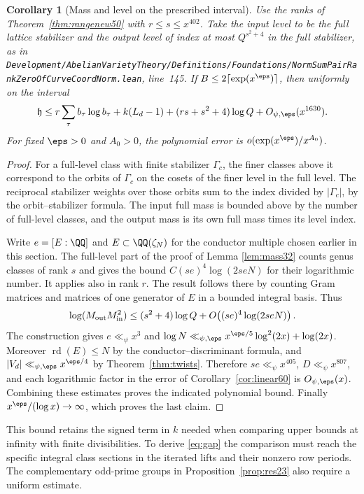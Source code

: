 \documentclass[a4paper,11pt]{article}
\newtheorem{corollary}[proposition]{Corollary}
\theoremstyle{definition}
\theoremstyle{remark}
\newcommand{\srcloc}[2]{{\small\nolinkurl{#1.lean}}, line~#2}
\numberwithin{equation}{section}
\begin{document}
\begin{corollary}[Mass and level on the prescribed interval]\label{cor:mass60}
Use the ranks of Theorem~\ref{thm:rangenew50} with
\(r\le s\le x^{402}\). Take the input level to be the full
lattice stabilizer and the output level of index at most
\(Q^{s^2+4}\) in the full stabilizer, as in
\srcloc{Development/AbelianVarietyTheory/Definitions/Foundations/NormSumPairRankZeroOfCurveCoordNorm}{145}.
If \(B\le2\lceil\exp(x^\eps)\rceil\), then uniformly on the interval
\[
 \mathfrak h\le r\sum_\tau b_\tau\log b_\tau+k(L_d-1)
        +(rs+s^2+4)\log Q+O_{\psi,\eps}(x^{1630}) .
\]
For fixed \(\eps>0\) and \(A_0>0\), the polynomial error is
\(o(\exp(x^\eps)/x^{A_0})\).
\end{corollary}
\begin{proof}
For a full-level class with finite stabilizer \(\Gamma_c\),
the finer classes above it correspond to the orbits of
\(\Gamma_c\) on the cosets of the finer level in the full level.
The reciprocal stabilizer weights over those orbits sum to the
index divided by \(|\Gamma_c|\), by the orbit--stabilizer
formula. The input full mass is bounded above by the number of
full-level classes, and the output mass is its own full mass
times its level index.

Write \(e=[E:\QQ]\) and \(E\subset\QQ(\zeta_N)\) for the
conductor multiple chosen earlier in this section. The full-level
part of the proof of
Lemma \ref{lem:mass32}
counts genus classes of rank \(s\) and gives the bound
\(C(se)^4\log(2seN)\) for their logarithmic number. It applies
also in rank \(r\). The result follows there by counting Gram
matrices and matrices of one generator of \(E\) in a bounded
integral basis. Thus
\[
 \log(M_{\rm out}M_{\rm in}^2)
       \le (s^2+4)\log Q + O\!\left((se)^4\log(2seN)\right).
\]
The construction gives \(e\ll_\psi x^3\) and
\(\log N\ll_{\psi,\eps} x^{\eps/5}\log^2(2x)+\log(2x)\).
Moreover \(\operatorname{rd}(E)\le N\) by the
conductor--discriminant formula, and
\(|V_d|\ll_{\psi,\eps} x^{\eps/4}\) by Theorem~\ref{thm:twists}.
Therefore \(se\ll_\psi x^{405}\), \(D\ll_\psi x^{807}\),
and each logarithmic factor in the error of
Corollary~\ref{cor:linear60} is \(O_{\psi,\eps}(x)\).
Combining these estimates proves the indicated polynomial bound.
Finally \(x^\eps/(\log x)\to\infty\), which proves the last claim.
\end{proof}

This bound retains the signed term in \(k\) needed when comparing
upper bounds at infinity with finite divisibilities. To
derive \eqref{eq:gap} the comparison must reach the specific
integral class sections in the iterated lifts and their nonzero
row periods. The complementary odd-prime groups in
Proposition~\ref{prop:res23} also require a uniform estimate.
\end{document}
